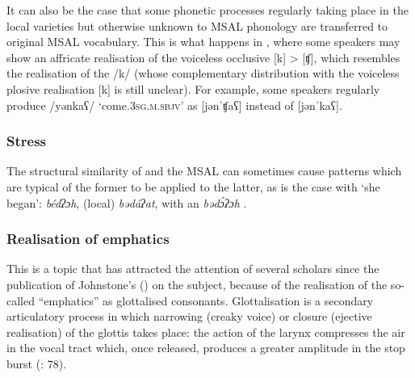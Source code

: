 \documentclass[output=paper]{langsci/langscibook}
\begin{document}
It can also be the case that some phonetic processes regularly taking place in the local  varieties but otherwise unknown to MSAL phonology are transferred to original MSAL vocabulary. This is what happens in , where some speakers may show an affricate realisation of the voiceless occlusive [k] > [ʧ], which resembles the   realisation of the  /k/ (whose complementary distribution with the voiceless plosive realisation [k] is still unclear). For example, some speakers regularly produce /yənkaʕ/ ‘come.\textsc{3sg.m.sbjv}’ as [jənˈʧaʕ] instead of [jənˈkaʕ]. 


 \subsubsection{Stress}

The structural similarity of  and the MSAL can sometimes cause  patterns which are typical of the former to be applied to the latter, as is the case with `she began':  \textit{bédʔɔh}, (local)  \textit{bədáʔat},  with an   \textit{bədɔ́ʔɔh} \citep[299]{Lonnet2011}.


 \subsubsection{Realisation of emphatics}\label{sec:key:emph}

This is a topic that has attracted the attention of several scholars since the publication of Johnstone’s (\citeyear{Johnstone1975})  on the subject, because of the realisation of the so-called  “emphatics” as glottalised consonants. Glottalisation is a secondary articulatory process in which narrowing (creaky voice) or closure (ejective realisation) of the glottis takes place: the action of the larynx compresses the air in the vocal tract which, once released, produces a greater amplitude in the stop burst (\citealt{LadefogedMaddieson1996}: 78). 
\end{document}
